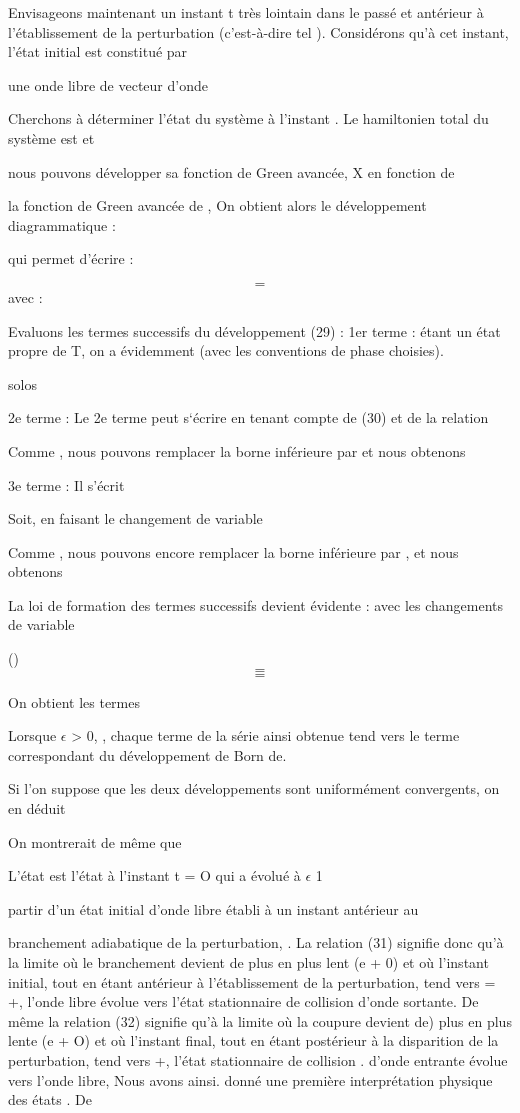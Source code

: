 Envisageons maintenant un instant t très lointain dans le
passé et antérieur à l'établissement de la perturbation (c'est-à-dire tel
). Considérons qu'à cet instant, l'état initial est constitué par

une onde libre de vecteur d'onde

Cherchons à déterminer l'état du système  à l'instant . Le
hamiltonien total du système est  et

nous pouvons développer sa fonction de Green avancée, X  en fonction de


la fonction de Green avancée de ,
On obtient alors le développement diagrammatique :

qui permet d'écrire :

\[
\tag{29}=
\]
avec :

Evaluons les termes successifs du développement (29) :
1er terme :  étant un état propre de T, on a évidemment
 (avec les conventions de phase choisies).

solos

 

2e terme : Le 2e terme peut s‘écrire en tenant compte de (30) et de la
relation 

Comme  , nous pouvons remplacer la borne inférieure par
et nous obtenons 

3e terme : Il s'écrit

Soit, en faisant le changement de variable 

Comme , nous pouvons encore remplacer la borne inférieure par ,
et nous obtenons

La loi de formation des termes successifs devient évidente : avec les
changements de variable

%
()
\[
\tag{31}=
\]
\[
\tag{32}=
\]

On obtient les termes

Lorsque $\epsilon$ > 0, , chaque terme de la série ainsi obtenue tend vers le terme
correspondant du développement de Born de.

Si l'on suppose que les deux développements sont uniformément convergents,
on en déduit

On montrerait de même que


L'état  est l'état à l'instant t = O qui a évolué à
$\epsilon$ 1

partir d'un état initial d'onde libre établi à un instant antérieur au

branchement adiabatique de la perturbation,
. La relation (31) signifie donc qu'à la limite où le branchement
devient de plus en plus lent (e + 0) et où l'instant initial, tout en étant
antérieur à l'établissement de la perturbation, tend vers = +, l'onde libre
évolue vers l'état stationnaire de collision d'onde sortante. De même la
relation (32) signifie qu'à la limite où la coupure devient de) plus en plus
lente (e + O) et où l'instant final, tout en étant postérieur à la disparition
de la perturbation, tend vers +, l'état stationnaire de collision
. d'onde entrante évolue vers l'onde libre, Nous avons ainsi. donné une première
interprétation physique des états . De 

